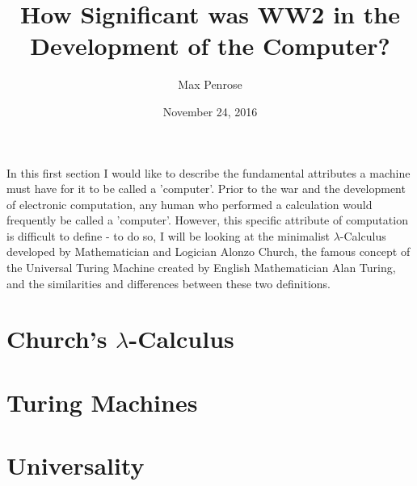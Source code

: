 \documentclass {article}
\title{How Significant was WW2 in the Development of the Computer?}
\date{November 24, 2016}
\author{Max Penrose}
\begin{document}
\maketitle
\tableofcontents


In this first section I would like to describe the fundamental attributes a machine must have for it to be called a 'computer'. Prior to the war and the development of electronic computation, any human who performed a calculation would  frequently be called a 'computer'. However, this specific attribute of computation is difficult to define - to do so, I will be looking at the minimalist  $\lambda$-Calculus developed by Mathematician and Logician Alonzo Church, the famous concept of the Universal Turing Machine created by English Mathematician Alan Turing, and the similarities and differences between these two definitions.  


\section{Church's $\lambda$-Calculus}



\section{Turing Machines}



\section{Universality}


\end{document}
